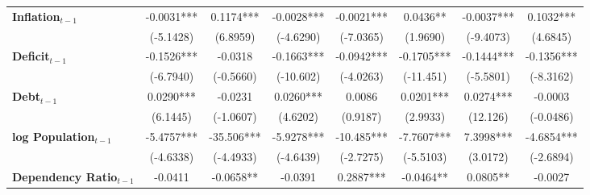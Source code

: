 \begin{center}
\begin{tabular}{lccccccc}
\textbf{Inflation$_{t-1}$}      &      -0.0031***      &          0.1174***          &          -0.0028***          &              -0.0021***             &             0.0436**             &          -0.0037***         &           0.1032***            \\
\textbf{ }                         &      (-5.1428)       &           (6.8959)          &          (-4.6290)           &              (-7.0365)              &             (1.9690)             &          (-9.4073)          &            (4.6845)            \\
\textbf{Deficit$_{t-1}$}             &      -0.1526***      &           -0.0318           &          -0.1663***          &              -0.0942***             &            -0.1705***            &          -0.1444***         &           -0.1356***           \\
\textbf{ }                         &      (-6.7940)       &          (-0.5660)          &          (-10.602)           &              (-4.0263)              &            (-11.451)             &          (-5.5801)          &           (-8.3162)            \\
\textbf{Debt$_{t-1}$}                &      0.0290***       &           -0.0231           &          0.0260***           &                0.0086               &            0.0201***             &          0.0274***          &            -0.0003             \\
\textbf{ }                         &       (6.1445)       &          (-1.0607)          &           (4.6202)           &               (0.9187)              &             (2.9933)             &           (12.126)          &           (-0.0486)            \\
\textbf{log Population$_{t-1}$}      &      -5.4757***      &          -35.506***         &          -5.9278***          &              -10.485***             &            -7.7607***            &          7.3998***          &           -4.6854***           \\
\textbf{ }                         &      (-4.6338)       &          (-4.4933)          &          (-4.6439)           &              (-2.7275)              &            (-5.5103)             &           (3.0172)          &           (-2.6894)            \\
\textbf{Dependency Ratio$_{t-1}$}   &       -0.0411        &          -0.0658**          &           -0.0391            &              0.2887***              &            -0.0464**             &           0.0805**          &            -0.0027             \\

\end{tabular}
\end{center}
